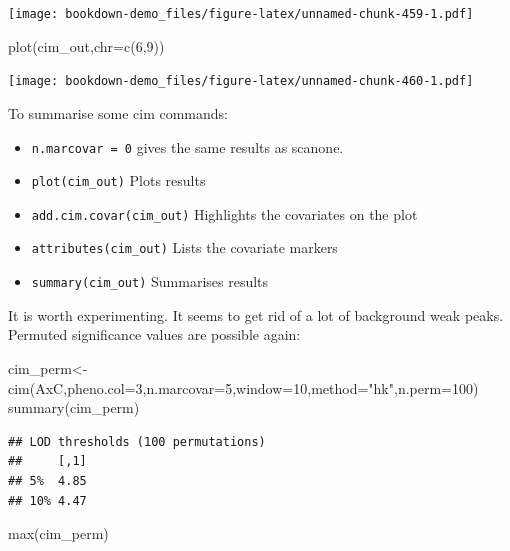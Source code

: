 \documentclass[
]{book}
\newenvironment{Shaded}{\begin{snugshade}}{\end{snugshade}}
\newcommand{\AttributeTok}[1]{\textcolor[rgb]{0.77,0.63,0.00}{#1}}
\newcommand{\DecValTok}[1]{\textcolor[rgb]{0.00,0.00,0.81}{#1}}
\newcommand{\FunctionTok}[1]{\textcolor[rgb]{0.00,0.00,0.00}{#1}}
\newcommand{\NormalTok}[1]{#1}
\newcommand{\OtherTok}[1]{\textcolor[rgb]{0.56,0.35,0.01}{#1}}
\newcommand{\StringTok}[1]{\textcolor[rgb]{0.31,0.60,0.02}{#1}}
\providecommand{\tightlist}{%
  \setlength{\itemsep}{0pt}\setlength{\parskip}{0pt}}
\begin{document}
\texttt{[image: bookdown-demo\_files/figure-latex/unnamed-chunk-459-1.pdf]}

\begin{Shaded}
\begin{Highlighting}[]
\FunctionTok{plot}\NormalTok{(cim\_out,}\AttributeTok{chr=}\FunctionTok{c}\NormalTok{(}\DecValTok{6}\NormalTok{,}\DecValTok{9}\NormalTok{)) }
\end{Highlighting}
\end{Shaded}

\texttt{[image: bookdown-demo\_files/figure-latex/unnamed-chunk-460-1.pdf]}

To summarise some cim commands:

\begin{itemize}
\tightlist
\item
  \texttt{n.marcovar\ =\ 0} gives the same results as scanone.
\item
  \texttt{plot(cim\_out)} Plots results
\item
  \texttt{add.cim.covar(cim\_out)} Highlights the covariates on the plot
\item
  \texttt{attributes(cim\_out)} Lists the covariate markers
\item
  \texttt{summary(cim\_out)} Summarises results
\end{itemize}

It is worth experimenting. It seems to get rid of a lot of background weak peaks. Permuted significance values are possible again:

\begin{Shaded}
\begin{Highlighting}[]
\NormalTok{cim\_perm}\OtherTok{\textless{}{-}}\FunctionTok{cim}\NormalTok{(AxC,}\AttributeTok{pheno.col=}\DecValTok{3}\NormalTok{,}\AttributeTok{n.marcovar=}\DecValTok{5}\NormalTok{,}\AttributeTok{window=}\DecValTok{10}\NormalTok{,}\AttributeTok{method=}\StringTok{"hk"}\NormalTok{,}\AttributeTok{n.perm=}\DecValTok{100}\NormalTok{) }
\FunctionTok{summary}\NormalTok{(cim\_perm) }
\end{Highlighting}
\end{Shaded}

\begin{verbatim}
## LOD thresholds (100 permutations)
##     [,1]
## 5%  4.85
## 10% 4.47
\end{verbatim}

\begin{Shaded}
\begin{Highlighting}[]
\FunctionTok{max}\NormalTok{(cim\_perm) }
\end{Highlighting}
\end{Shaded}
\end{document}

